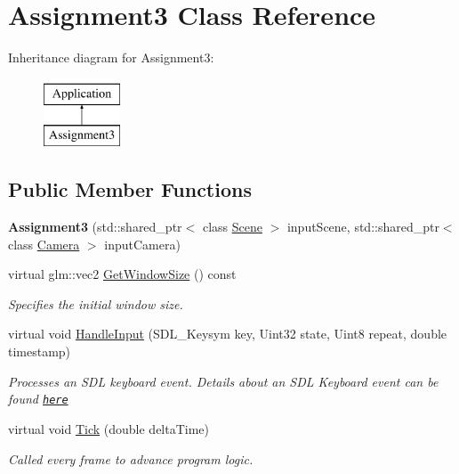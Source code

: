 \hypertarget{class_assignment3}{}\section{Assignment3 Class Reference}
\label{class_assignment3}
Inheritance diagram for Assignment3\+:\begin{figure}[H]
\begin{center}
\leavevmode
\includegraphics[height=2.000000cm]{class_assignment3}
\end{center}
\end{figure}
\subsection*{Public Member Functions}
\begin{DoxyCompactItemize}
\item 
\hypertarget{class_assignment3_adb8e9ac0681c600affc3370f5e5422b2}{}{\bfseries Assignment3} (std\+::shared\+\_\+ptr$<$ class \hyperlink{class_scene}{Scene} $>$ input\+Scene, std\+::shared\+\_\+ptr$<$ class \hyperlink{class_camera}{Camera} $>$ input\+Camera)\label{class_assignment3_adb8e9ac0681c600affc3370f5e5422b2}

\item 
virtual glm\+::vec2 \hyperlink{class_assignment3_a895e38d50717c935706a719f4368f5e8}{Get\+Window\+Size} () const 
\begin{DoxyCompactList}\small\item\em Specifies the initial window size. \end{DoxyCompactList}\item 
virtual void \hyperlink{class_assignment3_a7a3563e16c7fbd71d709decd266f6e9a}{Handle\+Input} (S\+D\+L\+\_\+\+Keysym key, Uint32 state, Uint8 repeat, double timestamp)
\begin{DoxyCompactList}\small\item\em Processes an S\+D\+L keyboard event. Details about an S\+D\+L Keyboard event can be found \href{https://wiki.libsdl.org/SDL_KeyboardEvent}{\tt here} \end{DoxyCompactList}\item 
virtual void \hyperlink{class_assignment3_a11256b6e7b38ab24baa92729cfb8ffe2}{Tick} (double delta\+Time)
\begin{DoxyCompactList}\small\item\em Called every frame to advance program logic. \end{DoxyCompactList}\end{DoxyCompactItemize}
